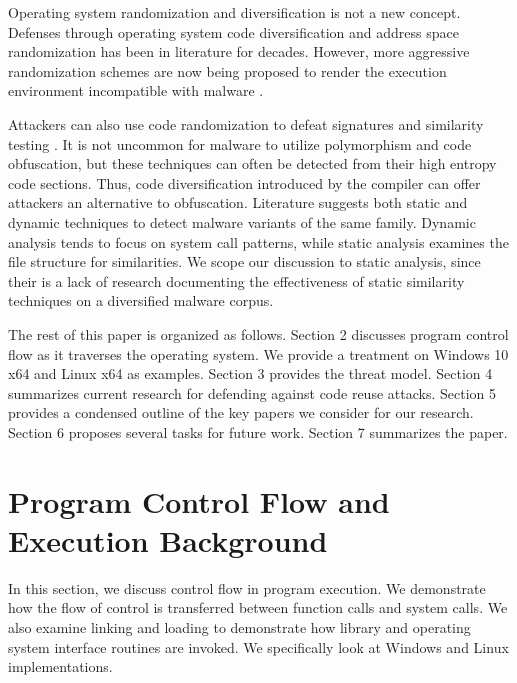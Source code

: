 \documentclass[preprint,12pt]{elsarticle}
\begin{document}
Operating system randomization and diversification is not a new concept. Defenses through operating system code diversification \cite{cohen1993operating} and address space randomization \cite{team2003pax} has been in literature for decades. However, more aggressive randomization schemes are now being proposed to render the execution environment incompatible with malware \cite{Rauti14}\cite{rauti2018internal}\cite{rauti2014towards}\cite{srivastava2008system}\cite{jiang2007randsys}\cite{giuffrida2012enhanced}\cite{chew2002mitigating}. 

Attackers can also use code randomization to defeat signatures and similarity testing \cite{payer2014embracing} \cite{payer2014similarity}. It is not uncommon for malware to utilize polymorphism and code obfuscation, but these techniques can often be detected from their high entropy code sections. Thus, code diversification introduced by the compiler can offer attackers an alternative to obfuscation. Literature suggests both static and dynamic techniques to detect malware variants of the same family. Dynamic analysis tends to focus on system call patterns, while static analysis examines the file structure for similarities. We scope our discussion to static analysis, since their is a lack of research documenting the effectiveness of static similarity techniques on a diversified malware corpus.

The rest of this paper is organized as follows. Section 2 discusses program control flow as it traverses the operating system. We provide a treatment on Windows 10 x64 and Linux x64 as examples. Section 3 provides the threat model. Section 4 summarizes current research for defending against code reuse attacks. Section 5 provides a condensed outline of the key papers we consider for our research. Section 6 proposes several tasks for future work. Section 7 summarizes the paper.

\section{Program Control Flow and Execution Background}
\label{S:2}

In this section, we discuss control flow in program execution. We demonstrate how the flow of control is transferred between function calls and system calls. We also examine linking and loading to demonstrate how library and operating system interface routines are invoked. We specifically look at Windows and Linux implementations.
\end{document}
